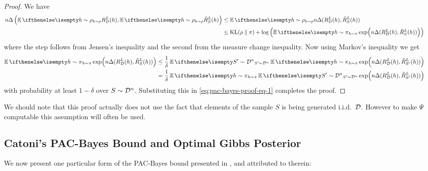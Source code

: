 \begin{proof}
  We have
  \begin{equation}
    \label{eq:pac-bayes-proof-eq-1}
    \begin{split}
      n \Delta\left(\Ev[h \sim \rho]{R_\CD^L(h)}, \Ev[h \sim
      \rho]{\hat{R}_S^L(h)}\right) &\leq \Ev[h \sim \rho]{n \Delta(R_\CD^L(h),
      \hat{R}_S^L(h))} \\
      &\leq \KL{\rho}{\pi} + \log\left(\Ev[h \sim \pi]{\exp(n \Delta(R_\CD^L(h),
      \hat{R}_S^L(h)))}\right)
    \end{split}
  \end{equation}
  where the step follows from Jensen's inequality and the second from the
  measure change inequality. Now using Markov's inequality we get
  \begin{equation}
    \begin{split}
      \Ev[h \sim \pi]{\exp(n \Delta(R_\CD^L(h), \hat{R}_S^L(h)))}
      &\leq \frac{1}{\delta} \Ev[S' \sim \CD^n]{\Ev[h \sim \pi]{\exp(n
      \Delta(R_\CD^L(h), \hat{R}_{S'}^L(h)))}} \\
      &= \frac{1}{\delta} \Ev[h \sim \pi]{\Ev[S' \sim \CD^n]{\exp(n
      \Delta(R_\CD^L(h), \hat{R}_{S'}^L(h)))}}
    \end{split}
  \end{equation}
  with probability at least $1 - \delta$ over $S \sim \mathcal{D}^n$.  Substituting this
  in \eqref{eq:pac-bayes-proof-eq-1} completes the proof.
\end{proof}

We should note that this proof actually does not use the fact that elements of
the sample $S$ is being generated i.i.d.\ $\mathcal{D}$. However to make $\Psi$
computable this assumption will often be used.

\subsection{Catoni's PAC-Bayes Bound and Optimal Gibbs Posterior}

We now present one particular form of the PAC-Bayes bound presented in
\cite{germain2016pac}, and attributed to \cite{catoni2007pac} therein:

